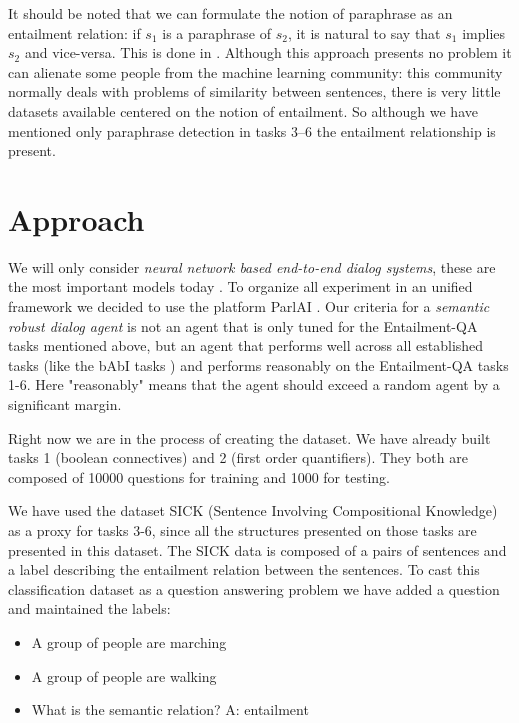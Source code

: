 It should be noted that we can formulate the notion of paraphrase as an entailment relation: if $s_1$ is a paraphrase of $s_2$, it is natural to say that $s_1$ implies $s_2$ and vice-versa. This is done in \cite{Marelli14}. Although this approach presents no problem it can alienate some people from the machine learning community: this community normally deals  with problems of similarity between sentences, there is very little datasets available centered on the notion of entailment. So although we have mentioned only paraphrase detection in tasks 3--6 the entailment relationship is present.


\section{Approach}
\label{ch:03-Approach}


We will only consider \textit{neural network based end-to-end dialog systems}, these are the most important models today \cite{BordesW16, Lowe:2016, Serban:2016c, Serban:2016a, Shao:2017, Wen}. To organize all experiment in an unified framework we decided to use the platform ParlAI \cite{MillerFFLBBPW17}. Our criteria for a \textit{semantic robust dialog agent} is not an agent that is only tuned for the Entailment-QA tasks mentioned above, but an agent that performs well across all established tasks (like the bAbI tasks \cite{WestonBCM15}) and performs reasonably on the Entailment-QA tasks 1-6. Here "reasonably" means that the agent should exceed a random agent by a significant margin.

Right now we are in the process of creating the dataset. We have already built tasks 1 (boolean connectives) and 2 (first order quantifiers). They both are composed of 10000 questions for training and 1000 for testing.

We have used the dataset SICK (Sentence Involving Compositional Knowledge) \cite{Marelli14} as a proxy for tasks 3-6, since all the structures presented on those tasks are presented in this dataset. The SICK data is composed of a pairs of sentences and a label describing the entailment relation between the sentences. To cast this classification dataset as a question answering problem we have added a question and maintained the labels: 

\begin{itemize} 
\item[] A group of people are marching
\item[] A group of people are walking
\item[] What is the semantic relation? A: entailment
\end{itemize}

